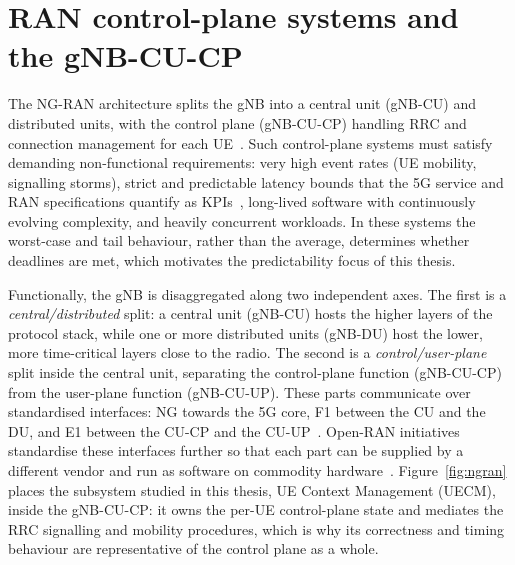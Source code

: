 \documentclass[english,oneside,a4paper,censored,csm,software-track-2020]{HYthesisML}
\begin{document}
\section{RAN control-plane systems and the gNB-CU-CP}
The NG-RAN architecture splits the gNB into a central unit (gNB-CU) and distributed units,
with the control plane (gNB-CU-CP) handling RRC and connection management for each
UE~\cite{3gpp38401,3gpp38300,3gpp38331}. Such control-plane systems must satisfy demanding
non-functional requirements: very high event rates (UE mobility, signalling storms), strict
and predictable latency bounds that the 5G service and RAN specifications quantify as
KPIs~\cite{3gpp38913,3gpp22261}, long-lived software with continuously evolving complexity,
and heavily concurrent workloads. In these systems the worst-case and tail behaviour,
rather than the average, determines whether deadlines are met, which motivates the
predictability focus of this thesis.

Functionally, the gNB is disaggregated along two independent axes. The first is a
\emph{central/distributed} split: a central unit (gNB-CU) hosts the higher layers of the
protocol stack, while one or more distributed units (gNB-DU) host the lower, more
time-critical layers close to the radio. The second is a \emph{control/user-plane} split
inside the central unit, separating the control-plane function (gNB-CU-CP) from the
user-plane function (gNB-CU-UP). These parts communicate over standardised
interfaces: NG towards the 5G core, F1 between the CU and the DU, and E1 between the CU-CP and
the CU-UP~\cite{3gpp38401,3gpp38300,3gpp38463}. Open-RAN initiatives standardise these interfaces
further so that each part can be supplied by a different vendor and run as software on
commodity hardware~\cite{polese2023oran}. Figure~\ref{fig:ngran} places the subsystem studied
in this thesis, UE Context Management (UECM), inside the gNB-CU-CP: it owns the per-UE
control-plane state and mediates the RRC signalling and mobility procedures, which is why its
correctness and timing behaviour are representative of the control plane as a whole.
\end{document}
